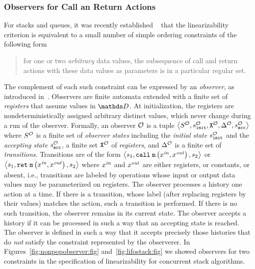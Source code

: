 \subsubsection{Observers for Call an Return Actions}
For stacks and queues, it was recently established
~\cite{BEEH:icalp15,HSV:concur13} that the linearizability criterion is equivalent to
a small number of simple ordering constraints of the following form
\begin{quote}
for one or two {\em arbitrary} data values, the subsequence of
call and return actions with these data values as parameters is in 
a particular regular set.
\end{quote}
The complement of each such constraint can be
expressed by an {\em observer}, as introduced in~\cite{AHHR:integrated}. 
%
Observers are
finite automata extended with a finite set of {\em registers}
that assume values in $\ddomain$. 
%
%
At initialization,
the registers are nondeterministically
assigned arbitrary distinct values, which never change
during a run of the observer. 
%
Formally, an observer ${\mathcal O}$ is a tuple
$\left\langle S^{\mathcal O},s^{\mathcal O}_{\tt init},{\tt X}^{{\mathcal O}},\Delta^{\mathcal O},s^{\mathcal O}_{\tt acc}\right\rangle$ where $S^{\mathcal O}$ is a finite set 
of {\it observer states} including the 
{\it initial state} $s^{\mathcal O}_{\tt init}$ and
the {\it accepting state} $s^{\mathcal O}_{\tt acc}$, 
a finite set ${\tt X}^{{\mathcal O}}$  
of {\it registers}, and $\Delta^{\mathcal O}$ is a finite
set of {\it transitions}.
%
%
Transitions are of the form 
$\left\langle s_1,\mathtt{call}\; {\tt m}\left(x^{\it in},x^{\it out}\right),s_2\right\rangle$ or
$\left\langle s_1,\mathtt{ret}\; {\tt m}\left(x^{\it in},x^{\it out}\right),s_2\right\rangle$
where $x^{\it in}$ and $x^{\it out}$ are either registers, or constants, or absent,
i.e., transitions are labeled by 
operations whose input or output data values may be parameterized on registers.
The observer processes a history one action at a time.
%
If there is a transition, whose label (after replacing registers by their
values) matches the action, such a transition is performed. 
%
If there is no
such transition, the observer remains in its current state.
The observer accepts a history if it can  be processed in such a way that
an accepting state is reached.
%
The observer is defined in such a way that it accepts precisely those
histories that do {\em not} satisfy the constraint represented by the observerer.
In Figures~\ref{fig:nonpopobserver:fig} and~\ref{fig:lifostack:fig} we showed
observers for two constraints in the specification of linearizability for
concurrent stack algorithms.
%
